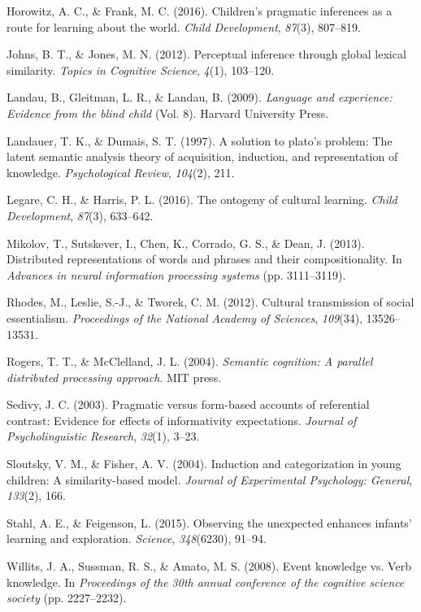 \documentclass[10pt, letterpaper]{article}
\begin{document}
\leavevmode\hypertarget{ref-horowitz2016}{}%
Horowitz, A. C., \& Frank, M. C. (2016). Children's pragmatic inferences
as a route for learning about the world. \emph{Child Development},
\emph{87}(3), 807--819.

\leavevmode\hypertarget{ref-johns2012}{}%
Johns, B. T., \& Jones, M. N. (2012). Perceptual inference through
global lexical similarity. \emph{Topics in Cognitive Science},
\emph{4}(1), 103--120.

\leavevmode\hypertarget{ref-landau2009}{}%
Landau, B., Gleitman, L. R., \& Landau, B. (2009). \emph{Language and
experience: Evidence from the blind child} (Vol. 8). Harvard University
Press.

\leavevmode\hypertarget{ref-landauer1997}{}%
Landauer, T. K., \& Dumais, S. T. (1997). A solution to plato's problem:
The latent semantic analysis theory of acquisition, induction, and
representation of knowledge. \emph{Psychological Review}, \emph{104}(2),
211.

\leavevmode\hypertarget{ref-legare2016}{}%
Legare, C. H., \& Harris, P. L. (2016). The ontogeny of cultural
learning. \emph{Child Development}, \emph{87}(3), 633--642.

\leavevmode\hypertarget{ref-mikolov2013}{}%
Mikolov, T., Sutskever, I., Chen, K., Corrado, G. S., \& Dean, J.
(2013). Distributed representations of words and phrases and their
compositionality. In \emph{Advances in neural information processing
systems} (pp. 3111--3119).

\leavevmode\hypertarget{ref-rhodes2012}{}%
Rhodes, M., Leslie, S.-J., \& Tworek, C. M. (2012). Cultural
transmission of social essentialism. \emph{Proceedings of the National
Academy of Sciences}, \emph{109}(34), 13526--13531.

\leavevmode\hypertarget{ref-rogers2004}{}%
Rogers, T. T., \& McClelland, J. L. (2004). \emph{Semantic cognition: A
parallel distributed processing approach}. MIT press.

\leavevmode\hypertarget{ref-sedivy2003}{}%
Sedivy, J. C. (2003). Pragmatic versus form-based accounts of
referential contrast: Evidence for effects of informativity
expectations. \emph{Journal of Psycholinguistic Research}, \emph{32}(1),
3--23.

\leavevmode\hypertarget{ref-sloutsky2004}{}%
Sloutsky, V. M., \& Fisher, A. V. (2004). Induction and categorization
in young children: A similarity-based model. \emph{Journal of
Experimental Psychology: General}, \emph{133}(2), 166.

\leavevmode\hypertarget{ref-stahl2015}{}%
Stahl, A. E., \& Feigenson, L. (2015). Observing the unexpected enhances
infants' learning and exploration. \emph{Science}, \emph{348}(6230),
91--94.

\leavevmode\hypertarget{ref-willits2008}{}%
Willits, J. A., Sussman, R. S., \& Amato, M. S. (2008). Event knowledge
vs. Verb knowledge. In \emph{Proceedings of the 30th annual conference
of the cognitive science society} (pp. 2227--2232).


\end{document}
